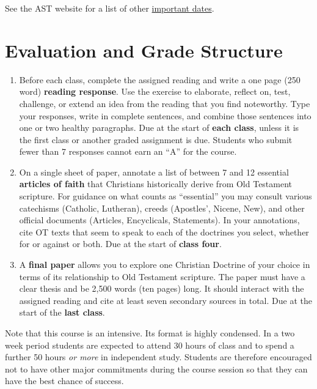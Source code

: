 \documentclass[titlepage]{article}
\begin{document}
See the AST website for a list of other \href{http://www.astheology.ns.ca/students/academic-dates.html}{important dates}.

\section{Evaluation and Grade Structure}
\label{evaluation}

\begin{enumerate}%

	\item Before each class, complete the assigned reading and write a
	one page (250 word) \textbf{reading response}. Use the exercise to
	elaborate, reflect on, test, challenge, or extend an idea from the
	reading that you find noteworthy. Type your responses, write in
	complete sentences, and combine those sentences into one or two
	healthy paragraphs. Due at the start of \textbf{each class}, unless
	it is the first class or another graded assignment is due. Students
	who submit fewer than 7 responses cannot earn an “A” for the course.

	\item On a single sheet of paper, annotate a list of between 7 and
	12 essential \textbf{articles of faith} that Christians historically
	derive from Old Testament scripture. For guidance on what counts as
	“essential” you may consult various catechisms (Catholic, Lutheran),
	creeds (Apostles', Nicene, New), and other official documents
	(Articles, Encyclicals, Statements). In your annotations, cite OT
	texts that seem to speak to each of the doctrines you select,
	whether for or against or both. Due at the start of \textbf{class
	four}.

	\item A \textbf{final paper} allows you to explore one Christian
	Doctrine of your choice in terms of its relationship to Old
	Testament scripture. The paper must have a clear thesis and be 2,500
	words (ten pages) long. It should interact with the assigned reading
	and cite at least seven secondary sources in total. Due at the start
	of the \textbf{last class}.

\end{enumerate}

Note that this course is an intensive. Its format is highly condensed.
In a two week period students are expected to attend 30 hours of class
and to spend a further 50 hours \emph{or more} in independent study.
Students are therefore encouraged not to have other major commitments
during the course session so that they can have the best chance of
success.
\end{document}
